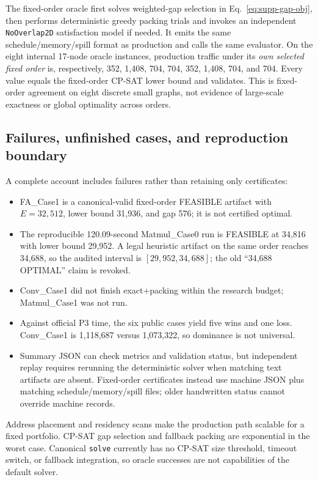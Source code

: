 The fixed-order oracle first solves weighted-gap selection in Eq.~\eqref{eq:supp-gap-obj}, then performs deterministic greedy packing trials and invokes an independent \texttt{NoOverlap2D} satisfaction model if needed. It emits the same schedule/memory/spill format as production and calls the same evaluator. On the eight internal 17-node oracle instances, production traffic under its \emph{own selected fixed order} is, respectively, 352, 1,408, 704, 704, 352, 1,408, 704, and 704. Every value equals the fixed-order CP-SAT lower bound and validates. This is fixed-order agreement on eight discrete small graphs, not evidence of large-scale exactness or global optimality across orders.

\subsection{Failures, unfinished cases, and reproduction boundary}

A complete account includes failures rather than retaining only certificates:
\begin{itemize}
  \item FA\_Case1 is a canonical-valid fixed-order FEASIBLE artifact with $E=32{,}512$, lower bound 31,936, and gap 576; it is not certified optimal.
  \item The reproducible 120.09-second Matmul\_Case0 run is FEASIBLE at 34,816 with lower bound 29,952. A legal heuristic artifact on the same order reaches 34,688, so the audited interval is $[29{,}952,34{,}688]$; the old ``34,688 OPTIMAL'' claim is revoked.
  \item Conv\_Case1 did not finish exact+packing within the research budget; Matmul\_Case1 was not run.
  \item Against official P3 time, the six public cases yield five wins and one loss. Conv\_Case1 is 1,118,687 versus 1,073,322, so dominance is not universal.
  \item Summary JSON can check metrics and validation status, but independent replay requires rerunning the deterministic solver when matching text artifacts are absent. Fixed-order certificates instead use machine JSON plus matching schedule/memory/spill files; older handwritten status cannot override machine records.
\end{itemize}

Address placement and residency scans make the production path scalable for a fixed portfolio. CP-SAT gap selection and fallback packing are exponential in the worst case. Canonical \texttt{solve} currently has no CP-SAT size threshold, timeout switch, or fallback integration, so oracle successes are not capabilities of the default solver.
